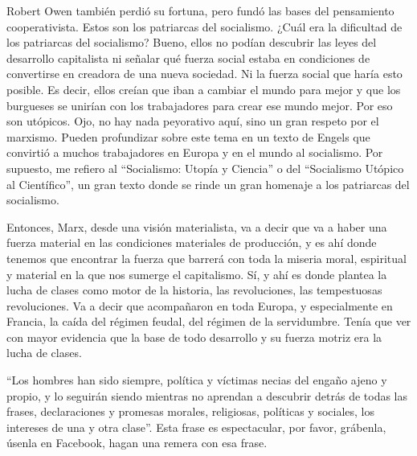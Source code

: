 \documentclass[
  jou,
  floatsintext,
  longtable,
  a4paper,
  nolmodern,
  notxfonts,
  notimes,
  12pt,
  colorlinks=true,linkcolor=blue,citecolor=blue,urlcolor=blue]{apa7}
\begin{document}
Robert Owen también perdió su fortuna, pero fundó las bases del
pensamiento cooperativista. Estos son los patriarcas del socialismo.
¿Cuál era la dificultad de los patriarcas del socialismo? Bueno, ellos
no podían descubrir las leyes del desarrollo capitalista ni señalar qué
fuerza social estaba en condiciones de convertirse en creadora de una
nueva sociedad. Ni la fuerza social que haría esto posible. Es decir,
ellos creían que iban a cambiar el mundo para mejor y que los burgueses
se unirían con los trabajadores para crear ese mundo mejor. Por eso son
utópicos. Ojo, no hay nada peyorativo aquí, sino un gran respeto por el
marxismo. Pueden profundizar sobre este tema en un texto de Engels que
convirtió a muchos trabajadores en Europa y en el mundo al socialismo.
Por supuesto, me refiero al ``Socialismo: Utopía y Ciencia'' o del
``Socialismo Utópico al Científico'', un gran texto donde se rinde un
gran homenaje a los patriarcas del socialismo.

Entonces, Marx, desde una visión materialista, va a decir que va a haber
una fuerza material en las condiciones materiales de producción, y es
ahí donde tenemos que encontrar la fuerza que barrerá con toda la
miseria moral, espiritual y material en la que nos sumerge el
capitalismo. Sí, y ahí es donde plantea la lucha de clases como motor de
la historia, las revoluciones, las tempestuosas revoluciones. Va a decir
que acompañaron en toda Europa, y especialmente en Francia, la caída del
régimen feudal, del régimen de la servidumbre. Tenía que ver con mayor
evidencia que la base de todo desarrollo y su fuerza motriz era la lucha
de clases.

``Los hombres han sido siempre, política y víctimas necias del engaño
ajeno y propio, y lo seguirán siendo mientras no aprendan a descubrir
detrás de todas las frases, declaraciones y promesas morales,
religiosas, políticas y sociales, los intereses de una y otra clase''.
Esta frase es espectacular, por favor, grábenla, úsenla en Facebook,
hagan una remera con esa frase.
\end{document}
